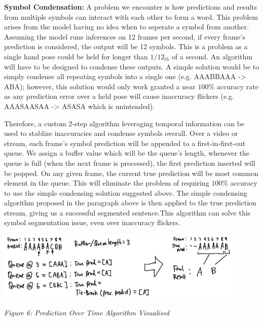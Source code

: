 \documentclass[11pt]{article}
\begin{document}
        \noindent\textbf{Symbol Condensation: }
        A problem we encounter is how predictions and results from multiple symbols can interact with each other to form a word. This problem arises from the model having no idea when to seperate a symbol from another. Assuming the model runs inferences on 12 frames per second, if every frame's prediction is considered, the output will be 12 symbols. This is a problem as a single hand pose could be held for longer than $1/12_{th}$ of a second. An algorithm will have to be designed to condense these outputs. A simple solution would be to simply condense all repeating symbols into a single one (e.g. AAABBAAA -> ABA); however, this solution would only work granted a near $100\%$ accuracy rate as any prediction error over a held pose will cause inaccuracy flickers (e.g. AAASAASAA -> ASASA which is unintended). 
        
        Therefore, a custom 2-step algorithm leveraging temporal information can be used to stablize inaccuracies and condense symbols overall. Over a video or stream, each frame's symbol prediction will be appended to a first-in-first-out queue. We assign a buffer value which will be the queue's length, whenever the queue is full (when the next frame is processed), the first prediction inserted will be popped. On any given frame, the current true prediction will be most common element in the queue. This will eliminate the problem of requiring $100\%$ accuracy to use the simple condensing solution suggested above. The simple condensing algorithm proposed in the paragraph above is then applied to the true prediction stream, giving us a successful segmented sentence.This algorithm can solve this symbol segmentation issue, even over inaccuracy flickers. 

        \begin{center}
            \includegraphics[width=12cm]{images/predOverTime.png}
            \\
            \raggedright \textit{
            Figure 6: Prediction Over Time Algorithm Visualised
            }
        \end{center}
\end{document}
